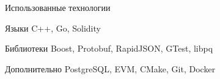 \documentclass[hyperref={pdfpagelabels=false}]{beamer}
\begin{document}
\begin{frame}{Использованные технологии}
\begin{block}{Языки}
	C++, Go, Solidity
\end{block}
\vfill
\begin{block}{Библиотеки}
	Boost, Protobuf, RapidJSON, GTest, libpq
\end{block}
\vfill
\begin{block}{Дополнительно}
	PostgreSQL, EVM, CMake, Git, Docker
\end{block}

\end{frame} 
\end{document}
